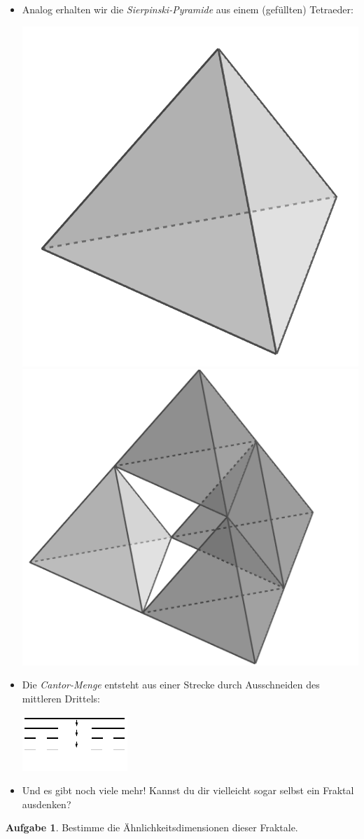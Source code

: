 \documentclass[a4paper,ngerman,12pt]{scrartcl}
\theoremstyle{definition}
\newtheorem{aufg}{Aufgabe}
\theoremstyle{plain}
\theoremstyle{remark}
\begin{document}
\begin{itemize}
	\item Analog erhalten wir die \emph{Sierpinski-Pyramide} aus einem (gefüllten) Tetraeder:
		\begin{center}
			\includegraphics[width=.3\textwidth]{Bilder/Tetraeder.png} \hspace{3em} \includegraphics[width=.3\textwidth]{Bilder/Sierpinski-Pyramide.png}
		\end{center}

	\item Die \emph{Cantor-Menge} entsteht aus einer Strecke durch Ausschneiden des mittleren Drittels:
		\begin{center}
			\includegraphics[width=.5\textwidth]{Bilder/Cantor_Menge.pdf}
		\end{center}
	
	\item Und es gibt noch viele mehr! Kannst du dir vielleicht sogar selbst ein Fraktal ausdenken?	
\end{itemize}

\begin{aufg}
	Bestimme die Ähnlichkeitsdimensionen dieser Fraktale.
\end{aufg}
\end{document}
